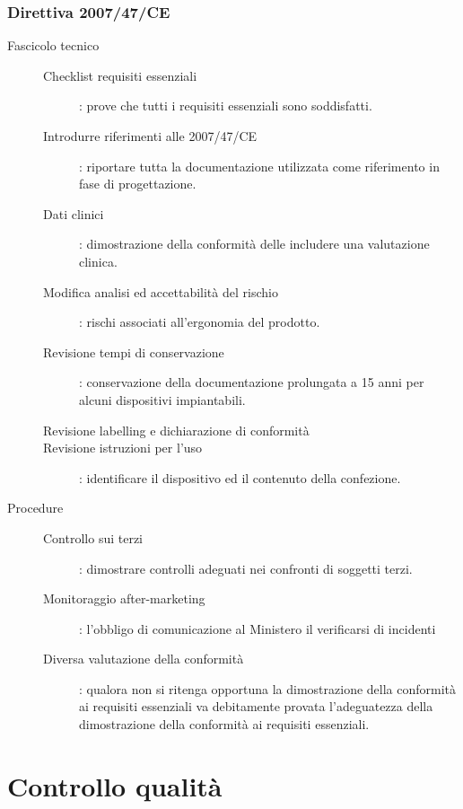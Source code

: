 \documentclass[a4paper]{article}
\begin{document}
\subsubsection{Direttiva 2007/47/CE}
\begin{description}
     \item[Fascicolo tecnico]
     \begin{description}
        \item[Checklist requisiti essenziali]: prove che tutti i requisiti essenziali sono 
        soddisfatti.
        \item[Introdurre riferimenti alle 2007/47/CE]: riportare tutta la documentazione 
        utilizzata come riferimento in fase di progettazione.
        \item[Dati clinici]: dimostrazione della conformità delle includere una valutazione 
        clinica.
        \item[Modifica analisi ed accettabilità del rischio]: rischi associati all'ergonomia 
        del prodotto.
        \item[Revisione tempi di conservazione]: conservazione della documentazione 
        prolungata a 15 anni per alcuni dispositivi impiantabili.
        \item[Revisione labelling e dichiarazione di conformità]
        \item[Revisione istruzioni per l'uso]: identificare il dispositivo ed il contenuto 
        della confezione.  
     \end{description}
     \item[Procedure]
     \begin{description}
         \item[Controllo sui terzi]: dimostrare controlli adeguati nei confronti di soggetti 
         terzi.
         \item[Monitoraggio after-marketing]: l'obbligo di comunicazione al Ministero il 
         verificarsi di incidenti
         \item[Diversa valutazione della conformità]: qualora non si ritenga opportuna 
         la dimostrazione della conformità ai requisiti essenziali va debitamente 
         provata l'adeguatezza della dimostrazione della conformità ai requisiti 
         essenziali.
     \end{description}  
\end{description}
\section{Controllo qualità}
\end{document}
